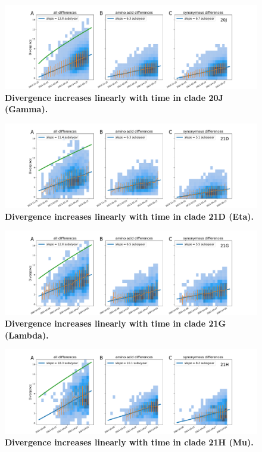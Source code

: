 \begin{figure}[h]
    \includegraphics[width=\textwidth]{figures/rtt/20J_rtt.pdf}
    \caption{{\bf Divergence increases linearly with time in clade 20J (Gamma).}
    \label{fig:20J_divergence}}
\end{figure}


\begin{figure}[h]
    \includegraphics[width=\textwidth]{figures/rtt/21D_rtt.pdf}
    \caption{{\bf Divergence increases linearly with time in clade 21D (Eta).}
    \label{fig:21D_divergence}}
\end{figure}

\begin{figure}[h]
    \includegraphics[width=\textwidth]{figures/rtt/21G_rtt.pdf}
    \caption{{\bf Divergence increases linearly with time in clade 21G (Lambda).}
    \label{fig:21G_divergence}}
\end{figure}

\begin{figure}[h]
    \includegraphics[width=\textwidth]{figures/rtt/21H_rtt.pdf}
    \caption{{\bf Divergence increases linearly with time in clade 21H (Mu).}
    \label{fig:21H_divergence}}
\end{figure}

